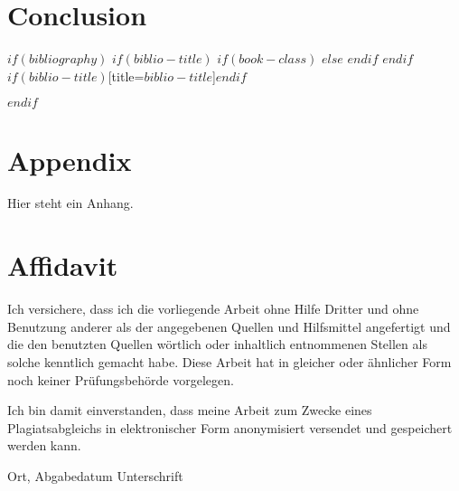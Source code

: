 \documentclass{scrbook}
\begin{document}
\chapter{Conclusion}

 
\backmatter
 
$if(bibliography)$
$if(biblio-title)$
$if(book-class)$
\renewcommand\bibname{$biblio-title$}
$else$
\renewcommand\refname{$biblio-title$}
$endif$
$endif$
\printbibliography$if(biblio-title)$[title=$biblio-title$]$endif$

$endif$
\chapter{Appendix}
Hier steht ein Anhang.



\chapter{Affidavit}
\thispagestyle{empty}

Ich versichere, dass ich die vorliegende Arbeit ohne Hilfe Dritter und ohne Benutzung anderer
als der angegebenen Quellen und Hilfsmittel angefertigt und die den benutzten Quellen
wörtlich oder inhaltlich entnommenen Stellen als solche kenntlich gemacht habe. Diese Arbeit
hat in gleicher oder ähnlicher Form noch keiner Prüfungsbehörde vorgelegen.

Ich bin damit einverstanden, dass meine Arbeit zum Zwecke eines Plagiatsabgleichs in
elektronischer Form anonymisiert versendet und gespeichert werden kann.

\vspace{4\baselineskip}
\begin{center}
\parbox{.8\textwidth}{Ort, Abgabedatum \hfill Unterschrift}
\end{center}

 
\end{document}

